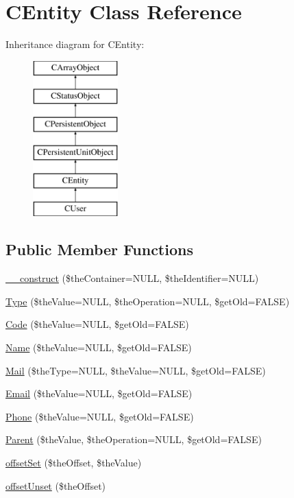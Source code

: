\hypertarget{class_c_entity}{\section{C\-Entity Class Reference}
\label{class_c_entity}
}
Inheritance diagram for C\-Entity\-:\begin{figure}[H]
\begin{center}
\leavevmode
\includegraphics[height=6.000000cm]{class_c_entity}
\end{center}
\end{figure}
\subsection*{Public Member Functions}
\begin{DoxyCompactItemize}
\item 
\hyperlink{class_c_entity_ac087e5b3d14357f452ab531db5f6a7e9}{\-\_\-\-\_\-construct} (\$the\-Container=N\-U\-L\-L, \$the\-Identifier=N\-U\-L\-L)
\item 
\hyperlink{class_c_entity_a78127acb8de5ae1e7238566396dd1c17}{Type} (\$the\-Value=N\-U\-L\-L, \$the\-Operation=N\-U\-L\-L, \$get\-Old=F\-A\-L\-S\-E)
\item 
\hyperlink{class_c_entity_a2b3cf77715881c3d8b3a6d4d80042e7c}{Code} (\$the\-Value=N\-U\-L\-L, \$get\-Old=F\-A\-L\-S\-E)
\item 
\hyperlink{class_c_entity_ace5878c009baf09d85c8ca115c48dbb0}{Name} (\$the\-Value=N\-U\-L\-L, \$get\-Old=F\-A\-L\-S\-E)
\item 
\hyperlink{class_c_entity_a44b389a90107f4c8aadcc4eb08e1ad9b}{Mail} (\$the\-Type=N\-U\-L\-L, \$the\-Value=N\-U\-L\-L, \$get\-Old=F\-A\-L\-S\-E)
\item 
\hyperlink{class_c_entity_acf65b6fb2f4195f6c649b4ca506c7899}{Email} (\$the\-Value=N\-U\-L\-L, \$get\-Old=F\-A\-L\-S\-E)
\item 
\hyperlink{class_c_entity_ac69e40a0ee4489abfcc7241d98b07532}{Phone} (\$the\-Value=N\-U\-L\-L, \$get\-Old=F\-A\-L\-S\-E)
\item 
\hyperlink{class_c_entity_ac8fc97b7adfc8ce547db5f93a9b913a8}{Parent} (\$the\-Value, \$the\-Operation=N\-U\-L\-L, \$get\-Old=F\-A\-L\-S\-E)
\item 
\hyperlink{class_c_entity_a193cf3d19057021bb6e779644730eac8}{offset\-Set} (\$the\-Offset, \$the\-Value)
\item 
\hyperlink{class_c_entity_a887a87fc716e36a0d4c1477dbaf5bb67}{offset\-Unset} (\$the\-Offset)
\end{DoxyCompactItemize}
